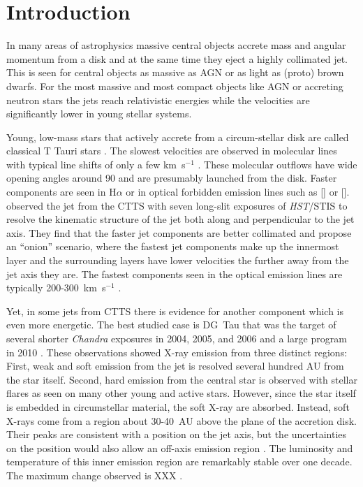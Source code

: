 \section{Introduction} 
In many areas of astrophysics massive central objects accrete mass and angular momentum from a disk and at the same time they eject a highly collimated jet. This is seen for central objects as massive as AGN or as light as (proto) brown dwarfs. For the most massive and most compact objects like AGN or accreting neutron stars the jets reach relativistic energies while the velocities are significantly lower in young stellar systems. 

Young, low-mass stars that actively accrete from a circum-stellar disk are called classical T Tauri stars \citep[for a review see][]{2013AN....334...67G}. The slowest velocities are observed in molecular lines with typical line shifts of only a few km~s$^{-1}$ \citep{2008ApJ...676..472B}. These molecular outflows have wide opening angles around 90\degree{} \citep[e.g.][]{2013A&A...557A.110S} and are presumably launched from the disk. Faster components are seen in H$\alpha$ or in optical forbidden emission lines such as [] or []. \citet{2000ApJ...537L..49B} observed the jet from the CTTS  with seven long-slit exposures of \emph{HST}/STIS to resolve the kinematic structure of the jet both along and perpendicular to the jet axis. They find that the faster jet components are better collimated and propose an ``onion'' scenario, where the fastest jet components make up the innermost layer and the surrounding layers have lower velocities the further away from the jet axis they are. The fastest components seen in the optical emission lines are typically 200-300~km~s$^{-1}$ \citep{2004Ap&SS.292..651B,2008ApJ...689.1112C,2013A&A...550L...1S}.

Yet, in some jets from CTTS there is evidence for another component which is even more energetic. The best studied case is DG~Tau that was the target of several shorter \emph{Chandra} exposures in 2004, 2005, and 2006 and a large program in 2010 \citep{2005ApJ...626L..53G,2008A&A...478..797G,2011ASPC..448..617G}. These observations showed X-ray emission from three distinct regions: First, weak and soft emission from the jet is resolved several hundred AU from the star itself. Second, hard emission from the central star is observed with stellar flares as seen on many other young and active stars. However, since the star itself is embedded in circumstellar material, the soft X-ray are absorbed. Instead, soft X-rays come from a region about 30-40~AU above the plane of the accretion disk. Their peaks are consistent with a position on the jet axis, but the uncertainties on the position would also allow an off-axis emission region \citep{2008A&A...488L..13S}. The luminosity and temperature of this inner emission region are remarkably stable over one decade. The maximum change observed is XXX \citep{SchneiderDGTauXray}.

